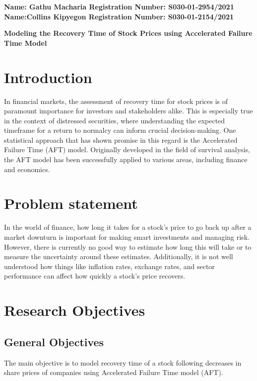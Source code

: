 \documentclass[twoside,a4paper,12pt]{article}
\begin{document}
	
	\begin{flushleft} 
			\large{\bf{Name: Gathu Macharia     Registration Number: S030-01-2954/2021\\
					   Name:Collins Kipyegon        Registration Number: S030-01-2154/2021\\}} \vspace*{0.75in}
	\end{flushleft}
	
	\begin{center} \Large{ \bf{Modeling the Recovery Time of Stock Prices using Accelerated Failure Time Model }} \end{center}	


\section*{Introduction}In financial markets, the assessment of recovery time for stock prices is of paramount importance for investors and stakeholders alike. This is especially true in the context of distressed securities, where understanding the expected timeframe for a return to normalcy can inform crucial decision-making. One statistical approach that has shown promise in this regard is the Accelerated Failure Time (AFT) model. Originally developed in the field of survival analysis, the AFT model has been successfully applied to various areas, including finance and economics.

\section*{Problem statement}In the world of finance, how long it takes for a stock's price to go back up after a market downturn is important for making smart investments and managing risk. However, there is currently no good way to estimate how long this will take or to measure the uncertainty around these estimates. Additionally, it is not well understood how things like inflation rates, exchange rates, and sector performance can affect how quickly a stock's price recovers.



\section*{Research Objectives} 
\subsection*{General Objectives}The main objective is to model recovery time of a stock following decreases in share prices of companies using Accelerated Failure Time model (AFT). 
\end{document}
